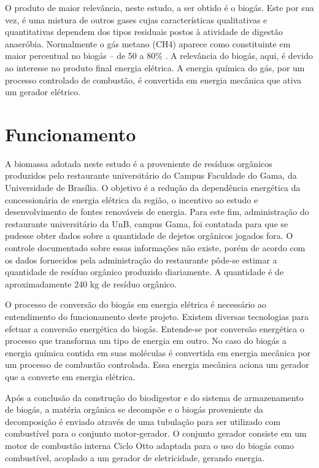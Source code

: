 \par O produto de maior relevância, neste estudo, a ser obtido é o biogás. Este por sua vez, é uma mistura de outros gases cujas características qualitativas e quantitativas dependem dos tipos residuais postos à atividade de digestão anaeróbia. Normalmente o gás metano (CH4) aparece como constituinte em maior percentual no biogás – de 50 a 80\% \cite{texier1979influence}. A relevância do biogás, aqui, é devido ao interesse no produto final energia elétrica. A energia química do gás, por um processo controlado de combustão, é convertida em energia mecânica que ativa um gerador elétrico.

\section {Funcionamento}
A biomassa adotada neste estudo é a proveniente de resíduos orgânicos produzidos pelo restaurante universitário do Campus Faculdade do Gama, da Universidade de Brasília. O objetivo é a redução da dependência energética da concessionária de energia elétrica da região, o incentivo ao estudo e desenvolvimento de fontes renováveis de energia.
Para este fim, administração do restaurante universitário da UnB, campus Gama, foi contatada para que se pudesse obter dados sobre a quantidade de dejetos orgânicos jogados fora. O controle documentado sobre essas informações não existe, porém de acordo com os dados fornecidos pela administração do restaurante pôde-se estimar a quantidade de resíduo orgânico produzido diariamente. A quantidade é de aproximadamente 240 kg de resíduo orgânico.
\par O processo de conversão do biogás em energia elétrica é necessário ao entendimento do funcionamento deste projeto. Existem diversas tecnologias para efetuar a conversão energética do biogás. Entende-se por conversão energética o processo que transforma um tipo de energia em outro. No caso do biogás a energia química contida em suas moléculas é convertida em energia mecânica por um processo de combustão controlada. Essa energia mecânica aciona um gerador que a converte em energia elétrica.
\par Após a conclusão da construção do biodigestor e do sistema de armazenamento de biogás, a matéria orgânica se decompõe e o biogás proveniente da decomposição é enviado através de uma tubulação para ser utilizado com combustível para o conjunto motor-gerador. O conjunto gerador consiste em um motor de combustão interna Ciclo Otto adaptada para o uso do biogás como combustível, acoplado a um gerador de eletricidade, gerando energia.
